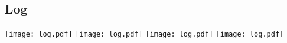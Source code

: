 \chapter{}
\label{"apx:log"}

\section{Log}
\label{"apx:log_sec"}
\centering
\texttt{[image: log.pdf]}
\newpage
\texttt{[image: log.pdf]}
\newpage
\texttt{[image: log.pdf]}
\newpage
\texttt{[image: log.pdf]}